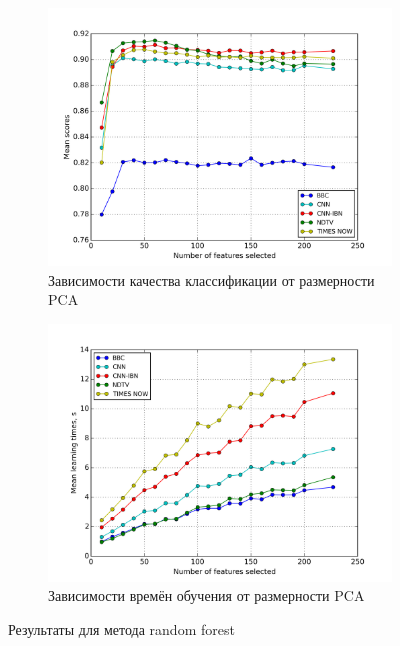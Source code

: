 \begin{figure}[h!]
    \centering
	\begin{subfigure}{0.45\textwidth}
		\includegraphics[width=\textwidth]{images/PCA-randfor.png}
		\caption{Зависимости качества классификации от размерности PCA}
	\end{subfigure}
	\begin{subfigure}{0.45\textwidth}
		\includegraphics[width=\textwidth]{images/PCA-randforTime.png}
		\caption{Зависимости времён обучения от размерности PCA}
	\end{subfigure}
	\caption{Результаты для метода random forest}\label{fig:randfor_pca}
\end{figure} 
 
